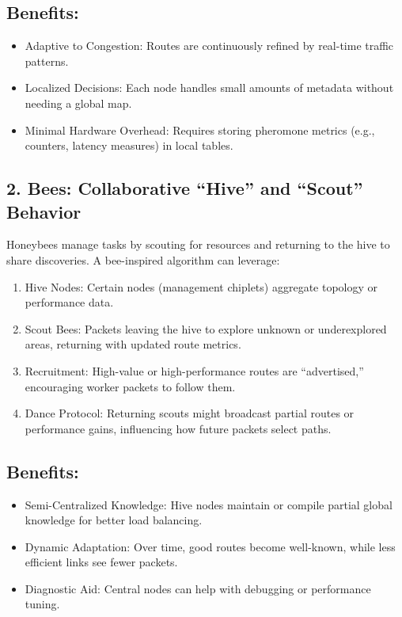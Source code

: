 \documentclass[../../../OAE-SPEC-MAIN.tex]{subfiles}
\begin{document}
\subsection{Benefits:}

\begin{itemize}
\item Adaptive to Congestion: Routes are continuously refined by real-time traffic patterns.
\item Localized Decisions: Each node handles small amounts of metadata without needing a global map.
\item Minimal Hardware Overhead: Requires storing pheromone metrics (e.g., counters, latency measures) in local tables.
\end{itemize}

\subsection{2. Bees: Collaborative “Hive” and “Scout” Behavior}

Honeybees manage tasks by scouting for resources and returning to the hive to share discoveries. A bee-inspired algorithm can leverage:
\begin{enumerate}
\item  Hive Nodes: Certain nodes (management chiplets) aggregate topology or performance data.
\item  Scout Bees: Packets leaving the hive to explore unknown or underexplored areas, returning with updated route metrics.
\item  Recruitment: High-value or high-performance routes are “advertised,” encouraging worker packets to follow them.
\item  Dance Protocol: Returning scouts might broadcast partial routes or performance gains, influencing how future packets select paths.
\end{enumerate}

\subsection{Benefits:}
\begin{itemize}
	\item Semi-Centralized Knowledge: Hive nodes maintain or compile partial global knowledge for better load balancing.
	\item Dynamic Adaptation: Over time, good routes become well-known, while less efficient links see fewer packets.
	\item Diagnostic Aid: Central nodes can help with debugging or performance tuning.
\end{itemize}
\end{document}
